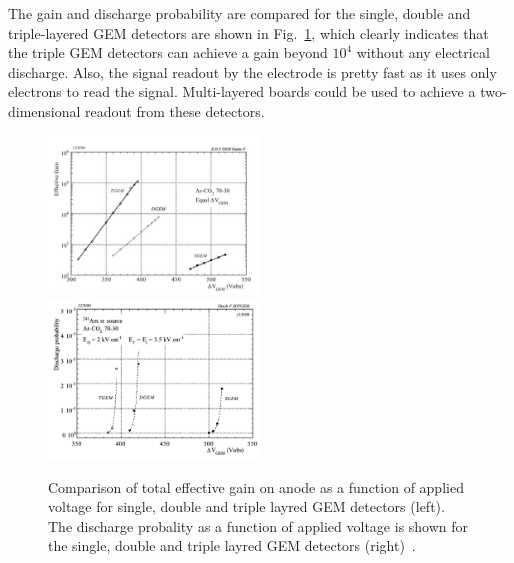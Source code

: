 The gain and discharge probability are compared for the single, double and triple-layered GEM detectors are shown in Fig.~\ref{fig:tripleGEM_discharge_gain}, which clearly indicates that the triple GEM detectors can achieve a gain beyond $10^4$ without any electrical discharge.
Also, the signal readout by the electrode is pretty fast as it uses only electrons to read the signal. 
Multi-layered boards could be used to achieve a two-dimensional readout from these detectors.
\begin{figure}[!htbp]
    \centering
    \includegraphics[width=0.5\textwidth]{figures/GEM/Comp_threeGEMS_Gain.png}%
    \includegraphics[width=0.5\textwidth]{figures/GEM/Comp_threeGEMS_DischargeProbability.png}
    \caption{Comparison of total effective gain on anode as a function of applied voltage for single, double and triple layred GEM detectors (left). The discharge probality as a function of applied voltage is shown for the single, double and triple layred GEM detectors (right)~\cite{Bachmann2002}.}
    \label{fig:tripleGEM_discharge_gain}
\end{figure}

